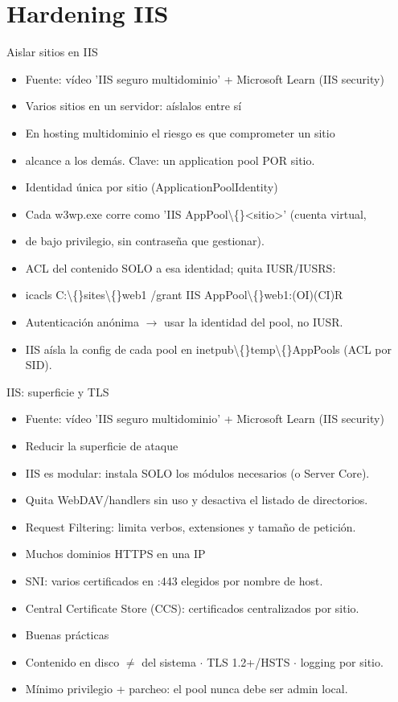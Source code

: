 \documentclass[aspectratio=169,10pt]{beamer}
\begin{document}
\section{Hardening IIS}

\begin{frame}[allowframebreaks]{Aislar sitios en IIS}
\small
  \begin{itemize}
  \item Fuente: vídeo 'IIS seguro multidominio' + Microsoft Learn (IIS security)
  \item Varios sitios en un servidor: aíslalos entre sí
  \item En hosting multidominio el riesgo es que comprometer un sitio
  \item alcance a los demás. Clave: un application pool POR sitio.
  \item Identidad única por sitio (ApplicationPoolIdentity)
  \item Cada w3wp.exe corre como 'IIS AppPool\textbackslash\{\}\textless{}sitio\textgreater{}' (cuenta virtual,
  \item de bajo privilegio, sin contraseña que gestionar).
  \item ACL del contenido SOLO a esa identidad; quita IUSR/IUSRS:
  \item icacls C:\textbackslash\{\}sites\textbackslash\{\}web1 /grant \textquotedbl{}IIS AppPool\textbackslash\{\}web1\textquotedbl{}:(OI)(CI)R
  \item Autenticación anónima $\rightarrow$ usar la identidad del pool, no IUSR.
  \item IIS aísla la config de cada pool en inetpub\textbackslash\{\}temp\textbackslash\{\}AppPools (ACL por SID).
  \end{itemize}
\end{frame}

\begin{frame}[allowframebreaks]{IIS: superficie y TLS}
\small
  \begin{itemize}
  \item Fuente: vídeo 'IIS seguro multidominio' + Microsoft Learn (IIS security)
  \item Reducir la superficie de ataque
  \item IIS es modular: instala SOLO los módulos necesarios (o Server Core).
  \item Quita WebDAV/handlers sin uso y desactiva el listado de directorios.
  \item Request Filtering: limita verbos, extensiones y tamaño de petición.
  \item Muchos dominios HTTPS en una IP
  \item SNI: varios certificados en :443 elegidos por nombre de host.
  \item Central Certificate Store (CCS): certificados centralizados por sitio.
  \item Buenas prácticas
  \item Contenido en disco $\neq$ del sistema $\cdot$ TLS 1.2+/HSTS $\cdot$ logging por sitio.
  \item Mínimo privilegio + parcheo: el pool nunca debe ser admin local.
  \end{itemize}
\end{frame}
\end{document}
